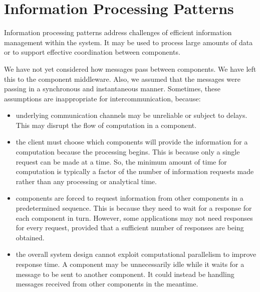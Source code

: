 \documentclass[a4paper, openany]{memoir}
\begin{document}
\section{Information Processing Patterns}
Information processing patterns address challenges of efficient information management within the system. It may be used to process large amounts of data or to support effective coordination between components.

We have not yet considered how messages pass between components. We have left this to the component middleware. Also, we assumed that the messages were passing in a synchronous and instantaneous manner. Sometimes, these assumptions are inappropriate for intercommunication, because:
\begin{itemize}
    \item underlying communication channels may be unreliable or subject to delays. This may disrupt the flow of computation in a component.
    \item the client must choose which components will provide the information for a computation because the processing begins. This is because only a single request can be made at a time. So, the minimum amount of time for computation is typically a factor of the number of information requests made rather than any processing or analytical time.
    \item components are forced to request information from other components in a predetermined sequence. This is because they need to wait for a response for each component in turn. However, some applications may not need responses for every request, provided that a sufficient number of responses are being obtained.
    \item the overall system design cannot exploit computational parallelism to improve response time. A component may be unnecessarily idle while it waits for a message to be sent to another component. It could instead be handling messages received from other components in the meantime.
\end{itemize}
\end{document}
